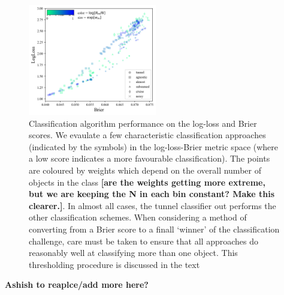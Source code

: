 \begin{figure}
	\begin{center}
		\includegraphics[width=0.5\textwidth]{./fig/all_effects_isolated.png}
		\caption{Classification algorithm performance on the log-loss and Brier scores. We evaulate a few characteristic classification approaches (indicated by the symbols) in the log-loss-Brier metric space (where a low score indicates a more favourable classification).
		The points are coloured by weights which depend on the overall number of objects in the class \textbf{[are the weights getting more extreme, but we are keeping the N in each bin constant? Make this clearer.]}.
		In almost all cases, the tunnel classifier out performs the other classification schemes.
		When considering a method of converting from a Brier score to a finall `winner' of the classification challenge, care must be taken to ensure that all approaches do reasonably well at classifying more than one object.
		This thresholding procedure is discussed in the text \label{fig:popweight}}
	\end{center}
\end{figure}

\textbf{Ashish to reaplce/add more here?}







